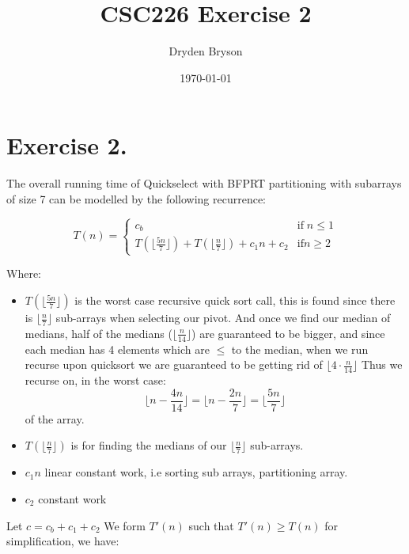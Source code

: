 \documentclass{article}
\title{CSC226 Exercise 2}
\author{Dryden Bryson}
\date{\today}
\begin{document}
\maketitle
\newpage

\section*{Exercise 2.}

The overall running time of Quickselect with BFPRT partitioning with subarrays of size 7 can be modelled by the following recurrence:

$$T(n)=\begin{cases}
c_{b} & \text{if} \;n \leq 1\\
T(\lfloor \frac{5n}{7} \rfloor ) + T(\lfloor \frac{n}{7} \rfloor ) + c_{1}n+c_{2} & \text{if} n \geq 2
\end{cases}$$

Where:
\begin{itemize}
    \item $T(\lfloor \frac{5n}{7} \rfloor )$ is the worst case recursive quick sort call, this is found since there is $\lfloor \frac{n}{7} \rfloor $ sub-arrays when selecting our pivot. And once we find our median of medians, half of the medians ($\lfloor \frac{n}{14} \rfloor $) are guaranteed to be bigger, and since each median has 4 elements which are $\leq$ to the median, when we run recurse upon quicksort we are guaranteed to be getting rid of $\lfloor 4\cdot \frac{n}{14} \rfloor $ Thus we recurse on, in the worst case: $$\lfloor n-\frac{4n}{14} \rfloor = \lfloor n-\frac{2n}{7} \rfloor =\lfloor \frac{5n}{7} \rfloor $$
    of the array.
    \item $T(\lfloor \frac{n}{7} \rfloor )$ is for finding the medians of our $\lfloor \frac{n}{7} \rfloor $ sub-arrays.
    \item $c_{1}n$ linear constant work, i.e sorting sub arrays, partitioning array.
    \item $c_{2}$ constant work
\end{itemize}
Let $c=c_{b}+c_{1}+c_{2}$ We form $T'(n)$ such that $T'(n) \geq T(n)$ for simplification, we have:
\end{document}
